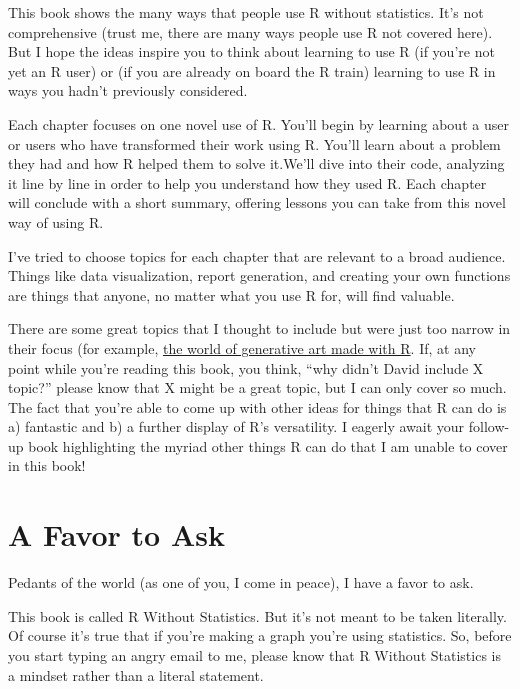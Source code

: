\documentclass[
]{book}
\begin{document}
This book shows the many ways that people use R without statistics. It's not comprehensive (trust me, there are many ways people use R not covered here). But I hope the ideas inspire you to think about learning to use R (if you're not yet an R user) or (if you are already on board the R train) learning to use R in ways you hadn't previously considered.

Each chapter focuses on one novel use of R. You'll begin by learning about a user or users who have transformed their work using R. You'll learn about a problem they had and how R helped them to solve it.We'll dive into their code, analyzing it line by line in order to help you understand how they used R. Each chapter will conclude with a short summary, offering lessons you can take from this novel way of using R.

I've tried to choose topics for each chapter that are relevant to a broad audience. Things like data visualization, report generation, and creating your own functions are things that anyone, no matter what you use R for, will find valuable.

There are some great topics that I thought to include but were just too narrow in their focus (for example, \href{https://blog.djnavarro.net/posts/2021-10-19_rtistry-posts/}{the world of generative art made with R}. If, at any point while you're reading this book, you think, ``why didn't David include X topic?'' please know that X might be a great topic, but I can only cover so much. The fact that you're able to come up with other ideas for things that R can do is a) fantastic and b) a further display of R's versatility. I eagerly await your follow-up book highlighting the myriad other things R can do that I am unable to cover in this book!

\hypertarget{a-favor-to-ask}{%
\section*{A Favor to Ask}\label{a-favor-to-ask}}

Pedants of the world (as one of you, I come in peace), I have a favor to ask.

This book is called R Without Statistics. But it's not meant to be taken literally. Of course it's true that if you're making a graph you're using statistics. So, before you start typing an angry email to me, please know that R Without Statistics is a mindset rather than a literal statement.
\end{document}
